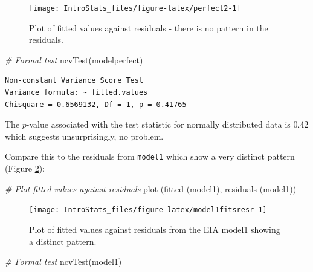 \documentclass[
  oneside]{krantz}
\newenvironment{Shaded}{\begin{snugshade}}{\end{snugshade}}
\newcommand{\CommentTok}[1]{\textcolor[rgb]{0.56,0.35,0.01}{\textit{#1}}}
\newcommand{\FunctionTok}[1]{\textcolor[rgb]{0.00,0.00,0.00}{#1}}
\newcommand{\NormalTok}[1]{#1}
\begin{document}
\begin{figure}

{\centering \texttt{[image: IntroStats\_files/figure-latex/perfect2-1]} 

}

\caption{Plot of fitted values against residuals - there is no pattern in the residuals.}\label{fig:perfect2}
\end{figure}

\begin{Shaded}
\begin{Highlighting}[]
\CommentTok{\# Formal test}
\FunctionTok{ncvTest}\NormalTok{(modelperfect)}
\end{Highlighting}
\end{Shaded}

\begin{verbatim}
Non-constant Variance Score Test 
Variance formula: ~ fitted.values 
Chisquare = 0.6569132, Df = 1, p = 0.41765
\end{verbatim}

The \(p\)-value associated with the test statistic for normally distributed data is 0.42 which suggests unsurprisingly, no problem.

Compare this to the residuals from \texttt{model1} which show a very distinct pattern (Figure \ref{fig:model1fitsresr}):

\begin{Shaded}
\begin{Highlighting}[]
\CommentTok{\# Plot fitted values against residuals}
\FunctionTok{plot}\NormalTok{ (}\FunctionTok{fitted}\NormalTok{ (model1), }\FunctionTok{residuals}\NormalTok{ (model1))}
\end{Highlighting}
\end{Shaded}

\begin{figure}

{\centering \texttt{[image: IntroStats\_files/figure-latex/model1fitsresr-1]} 

}

\caption{Plot of fitted values against residuals from the EIA model1 showing a distinct pattern.}\label{fig:model1fitsresr}
\end{figure}

\begin{Shaded}
\begin{Highlighting}[]
\CommentTok{\# Formal test}
\FunctionTok{ncvTest}\NormalTok{(model1)}
\end{Highlighting}
\end{Shaded}
\end{document}
